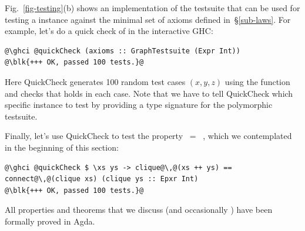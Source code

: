 Fig.~\ref{fig-testing}(b) shows an implementation of the 
testsuite that can be used for testing a  instance against
the minimal set of axioms defined in~\S\ref{sub-laws}.
For example, let's do a quick check of  in the interactive GHC:

\begin{verbatim}
@\ghci @quickCheck (axioms :: GraphTestsuite (Expr Int))
@\blk{+++ OK, passed 100 tests.}@
\end{verbatim}

\noindent
Here QuickCheck generates 100 random test cases $(x,y,z)$ using the 
function and checks that  holds in each case. Note
that we have to tell QuickCheck which specific  instance to test
by providing a type signature for the polymorphic  testsuite.

Finally, let's use QuickCheck to test the property
 $\ =\ $ ,
which we contemplated in the beginning of this section:

\begin{verbatim}
@\ghci @quickCheck $ \xs ys -> clique@\,@(xs ++ ys) == connect@\,@(clique xs) (clique ys :: Epxr Int)
@\blk{+++ OK, passed 100 tests.}@
\end{verbatim}

\noindent
All properties and theorems that we discuss (and occasionally )
have been formally proved in Agda.
